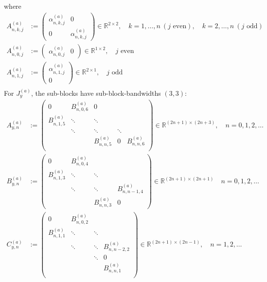 \documentclass[11pt, oneside]{article}   	%
\newcommand{\R}{\mathbb{R}}
\newcommand{\alphaa}{\alpha^{(a)}}
\begin{document}
where
\begin{align*}
	A^{(a)}_{n,k,j} &:= 
		\begin{pmatrix}
			\alphaa_{n,k,j} & 0 \\
			0 & \alphaa_{n,k,j}
		\end{pmatrix} \in \R^{2\times2}, \quad k = 1,\dots,n \: (j \text{ even}), \quad k = 2,\dots,n \: (j \text{ odd}) \\
	A^{(a)}_{n,0,j} &:=
		\begin{pmatrix}
			\alphaa_{n,0,j} & 0
		\end{pmatrix} \in \R^{1\times2}, \quad j \text{ even} \\
	A^{(a)}_{n,1,j} &:=
		\begin{pmatrix}
			\alphaa_{n,1,j} \\
			0
		\end{pmatrix} \in \R^{2\times1}, \quad j \text{ odd} \\
\end{align*}
For $J_y^{(a)}$, the sub-blocks have sub-block-bandwidths $(3,3)$:
\begin{align*}
	A^{(a)}_{y,n} &:= 
		\begin{pmatrix}
			0 & B^{(a)}_{n,0,6} & 0 & & \\
			B^{(a)}_{n,1,5} & \ddots & \ddots & & \\
			& \ddots & \ddots & \ddots & \\
			& & B^{(a)}_{n,n,5} & 0 & B^{(a)}_{n,n,6} \\
		\end{pmatrix} \in \R^{(2n+1)\times(2n+3)}, \quad n = 0,1,2,\dots \\
	B^{(a)}_{y,n} &:= 
		\begin{pmatrix}
			0 & B^{(a)}_{n,0,4} & & \\
			B^{(a)}_{n,1,3} & \ddots & \ddots & \\
			& \ddots & \ddots & B^{(a)}_{n,n-1,4} \\
			& & B^{(a)}_{n,n,3} & 0
		\end{pmatrix} \in \R^{(2n+1)\times(2n+1)}  \quad n = 0,1,2,\dots \\
	C^{(a)}_{y,n} &:= 
		\begin{pmatrix}
			0 & B^{(a)}_{n,0,2} & & \\
			B^{(a)}_{n,1,1} & \ddots & \ddots & \\
			& \ddots & \ddots & B^{(a)}_{n,n-2,2} \\
			& & \ddots & 0 \\
			& & & B^{(a)}_{n,n,1} \\
		\end{pmatrix} \in \R^{(2n+1)\times(2n-1)}, \quad n = 1,2,\dots
\end{align*}
\end{document}
